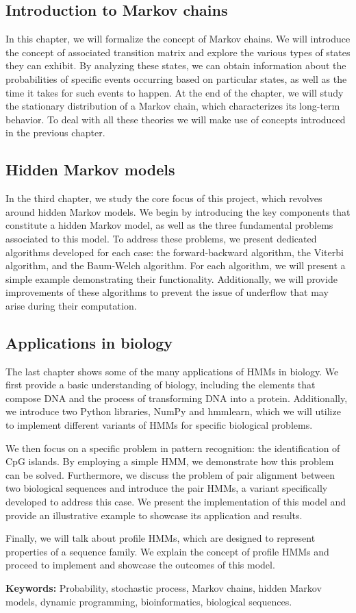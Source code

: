 \subsection*{Introduction to Markov chains}
In this chapter, we will formalize the concept of Markov chains. We will introduce the concept of associated transition matrix and explore the various types of states they can exhibit. By analyzing these states, we can obtain information about the probabilities of specific events occurring based on particular states, as well as the time it takes for such events to happen. At the end of the chapter, we will study the stationary distribution of a Markov chain, which characterizes its long-term behavior. To deal with all these theories we will make use of concepts introduced in the previous chapter.

\subsection*{Hidden Markov models}
In the third chapter, we study the core focus of this project, which revolves around hidden Markov models. We begin by introducing the key components that constitute a hidden Markov model, as well as the three fundamental problems associated to this model. To address these problems, we present dedicated algorithms developed for each case: the forward-backward algorithm, the Viterbi algorithm, and the Baum-Welch algorithm. For each algorithm, we will present a simple example demonstrating their functionality. Additionally, we will provide improvements of these algorithms to prevent the issue of underflow that may arise during their computation.

\subsection*{Applications in biology}
The last chapter shows some of the many applications of HMMs in biology. We first provide a basic understanding of biology, including the elements that compose DNA and the process of transforming DNA into a protein. Additionally, we introduce two Python libraries, NumPy and hmmlearn, which we will utilize to implement different variants of HMMs for specific biological problems.

We then focus on a specific problem in pattern recognition: the identification of CpG islands. By employing a simple HMM, we demonstrate how this problem can be solved. Furthermore, we discuss the problem of pair alignment between two biological sequences and introduce the pair HMMs, a variant specifically developed to address this case. We present the implementation of this model and provide an illustrative example to showcase its application and results.

Finally, we will talk about profile HMMs, which are designed to represent properties of a sequence family. We explain the concept of profile HMMs and proceed to implement and showcase the outcomes of this model.

\textbf{Keywords:} Probability, stochastic process, Markov chains, hidden Markov models, dynamic programming, bioinformatics, biological sequences.